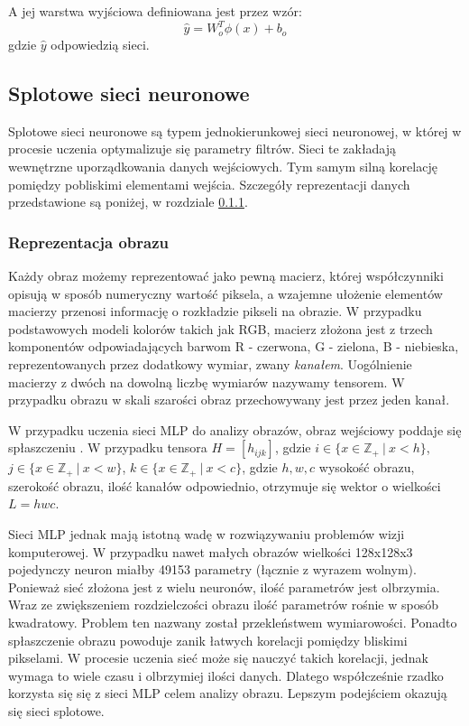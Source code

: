 A jej warstwa wyjściowa definiowana jest przez wzór:
\[\hat{y}=W^T_o\phi(x)+b_o\]
gdzie $\hat{y}$ odpowiedzią sieci\cite{matematyk2022-fh}. 

\subsection{Splotowe sieci neuronowe}
\label{sec:cnn}
Splotowe sieci neuronowe są typem jednokierunkowej sieci neuronowej, w której w procesie uczenia optymalizuje się parametry filtrów. Sieci te zakładają wewnętrzne uporządkowania danych wejściowych. Tym samym silną korelację pomiędzy pobliskimi elementami wejścia\cite{lecun1998gradient}. Szczegóły reprezentacji danych przedstawione są poniżej, w rozdziale \ref{sec:imgRepresentation}.
\subsubsection{Reprezentacja obrazu}
\label{sec:imgRepresentation}
\par
Każdy obraz możemy reprezentować jako pewną macierz, której współczynniki opisują w sposób numeryczny wartość piksela, a wzajemne ułożenie elementów macierzy przenosi informację o rozkładzie pikseli na obrazie. W przypadku podstawowych modeli kolorów takich jak RGB, macierz złożona jest z trzech komponentów odpowiadających barwom R - czerwona, G - zielona, B - niebieska, reprezentowanych przez dodatkowy wymiar, zwany \textit{kanałem}. Uogólnienie macierzy z dwóch na dowolną liczbę wymiarów nazywamy tensorem. W przypadku obrazu w skali szarości obraz przechowywany jest przez jeden kanał\cite{zhong2016overview}. 
\par 
W przypadku uczenia sieci MLP do analizy obrazów, obraz wejściowy poddaje się spłaszczeniu . W przypadku tensora $H=[h_{ijk}]$, gdzie $i \in \{x \in \mathbb{Z}_+ \ | \ x <h \}$, $j \in \{x \in \mathbb{Z}_+ \ | \ x <w \}$,  $k \in \{x \in \mathbb{Z}_+ \ | \ x <c \}$, gdzie $h,w,c$ wysokość obrazu, szerokość obrazu, ilość kanałów odpowiednio, otrzymuje się wektor o wielkości $L=hwc$.
\par
Sieci MLP jednak mają istotną wadę w rozwiązywaniu problemów wizji komputerowej. W przypadku nawet małych obrazów wielkości 128x128x3 pojedynczy neuron miałby 49153 parametry (łącznie z wyrazem wolnym). Ponieważ sieć złożona jest z wielu neuronów, ilość parametrów jest olbrzymia. Wraz ze zwiększeniem rozdzielczości obrazu ilość parametrów rośnie w sposób kwadratowy. Problem ten nazwany został przekleństwem wymiarowości. Ponadto spłaszczenie obrazu powoduje zanik łatwych korelacji pomiędzy bliskimi pikselami. W procesie uczenia sieć może się nauczyć takich korelacji, jednak wymaga to wiele czasu i olbrzymiej ilości danych\cite{matematyk2022-fh}. Dlatego współcześnie rzadko korzysta się się z sieci MLP celem analizy obrazu. Lepszym podejściem okazują się sieci splotowe. 



